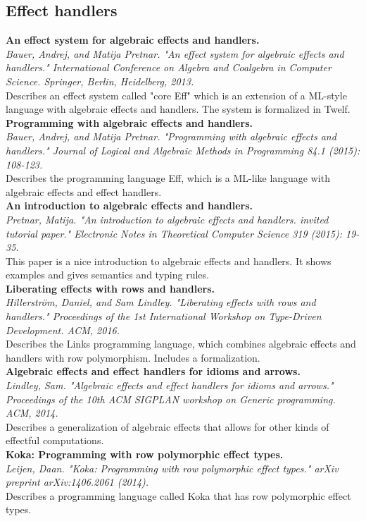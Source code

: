 \documentclass[12pt]{article}
\begin{document}
\subsection{Effect handlers}
\textbf{An effect system for algebraic effects and handlers.} \\
\textit{Bauer, Andrej, and Matija Pretnar. "An effect system for algebraic effects and handlers." International Conference on Algebra and Coalgebra in Computer Science. Springer, Berlin, Heidelberg, 2013.} \\
Describes an effect system called "core Eff" which is an extension of a ML-style language with algebraic effects and handlers. The system is formalized in Twelf.
\\
\textbf{Programming with algebraic effects and handlers.} \\
\textit{Bauer, Andrej, and Matija Pretnar. "Programming with algebraic effects and handlers." Journal of Logical and Algebraic Methods in Programming 84.1 (2015): 108-123.} \\
Describes the programming language Eff, which is a ML-like language with algebraic effects and effect handlers.
\\
\textbf{An introduction to algebraic effects and handlers.} \\
\textit{Pretnar, Matija. "An introduction to algebraic effects and handlers. invited tutorial paper." Electronic Notes in Theoretical Computer Science 319 (2015): 19-35.} \\
This paper is a nice introduction to algebraic effects and handlers. It shows examples and gives semantics and typing rules.
\\
\textbf{Liberating effects with rows and handlers.} \\
\textit{Hillerström, Daniel, and Sam Lindley. "Liberating effects with rows and handlers." Proceedings of the 1st International Workshop on Type-Driven Development. ACM, 2016.} \\
Describes the Links programming language, which combines algebraic effects and handlers with row polymorphism. Includes a formalization.
\\
\textbf{Algebraic effects and effect handlers for idioms and arrows.} \\
\textit{Lindley, Sam. "Algebraic effects and effect handlers for idioms and arrows." Proceedings of the 10th ACM SIGPLAN workshop on Generic programming. ACM, 2014.} \\
Describes a generalization of algebraic effects that allows for other kinds of effectful computations.
\\
\textbf{Koka: Programming with row polymorphic effect types.} \\
\textit{Leijen, Daan. "Koka: Programming with row polymorphic effect types." arXiv preprint arXiv:1406.2061 (2014).} \\
Describes a programming language called Koka that has row polymorphic effect types.
\end{document}
